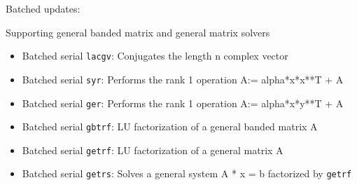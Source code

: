 

\begin{frame}[fragile]

  {\Huge Batched updates:}\\
  \vspace{10pt}

  Supporting general banded matrix and general matrix solvers
  \begin{itemize}
  \item Batched serial \texttt{lacgv}: Conjugates the length n complex vector
  \item Batched serial \texttt{syr}: Performs the rank 1 operation A:= alpha*x*x**T + A
  \item Batched serial \texttt{ger}: Performs the rank 1 operation A:= alpha*x*y**T + A
  \item Batched serial \texttt{gbtrf}: LU factorization of a general banded matrix A
  \item Batched serial \texttt{getrf}: LU factorization of a general matrix A
  \item Batched serial \texttt{getrs}: Solves a general system A * x = b factorized by \texttt{getrf}
  \end{itemize}  
\end{frame}
  

